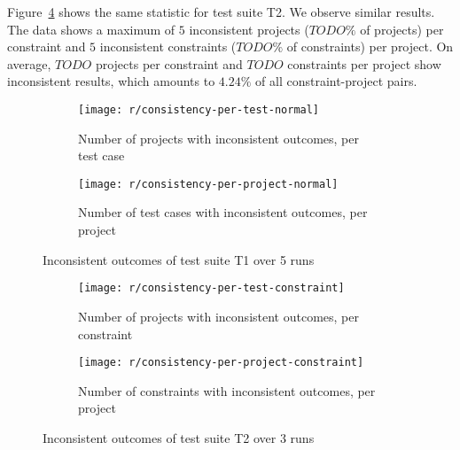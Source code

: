 \noindent Figure~\ref{fig:consistency_per_test_constraint} shows the same statistic for test suite T2.
We observe similar results.
The data shows a maximum of $5$ inconsistent projects ($TODO\%$ of projects) per constraint and $5$ inconsistent constraints ($TODO\%$ of constraints) per project.
On average, $TODO$ projects per constraint and $TODO$ constraints per project show inconsistent results,
which amounts to $4.24\%$ of all constraint-project pairs.
\parspace

\begin{figure}[htpb]
    \centering
    \begin{subfigure}{.7\textwidth}
        \texttt{[image: r/consistency-per-test-normal]}%
        \vspace{-\medskipamount}
        \caption{Number of projects with inconsistent outcomes, per test case}
        \label{fig:consistency_per_test_normal}
    \end{subfigure}

    \bigskip

    \begin{subfigure}{.7\textwidth}
        \texttt{[image: r/consistency-per-project-normal]}%
        \vspace{-\medskipamount}
        \caption{Number of test cases with inconsistent outcomes, per project}
        \label{fig:consistency_per_project_normal}
    \end{subfigure}

    \caption{Inconsistent outcomes of test suite T1 over 5 runs}
    \label{fig:consistency_normal}
\end{figure}

\begin{figure}[htpb]
    \centering
    \begin{subfigure}{.7\textwidth}
        \texttt{[image: r/consistency-per-test-constraint]}%
        \vspace{-\medskipamount}
        \caption{Number of projects with inconsistent outcomes, per constraint}
        \label{fig:consistency_per_test_constraint}
    \end{subfigure}

    \bigskip

    \begin{subfigure}{.7\textwidth}
        \texttt{[image: r/consistency-per-project-constraint]}%
        \vspace{-\medskipamount}
        \caption{Number of constraints with inconsistent outcomes, per project}
        \label{fig:consistency_per_project_constraint}
    \end{subfigure}

    \caption{Inconsistent outcomes of test suite T2 over 3 runs}
    \label{fig:consistency_constraint}
\end{figure}


